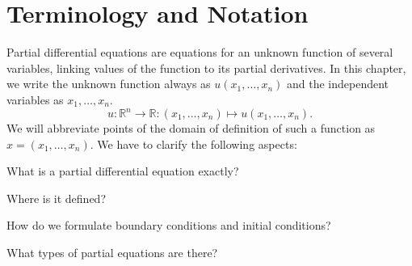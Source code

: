 %
% 
%
\chapter{Terminology and Notation
\label{chapter:terminology-and-notation}}
Partial differential equations are equations for an unknown function of
several variables, linking values of the function to its partial
derivatives.
In this chapter, we write the unknown function always as $u(x_1,\dots,x_n)$
and the independent variables as $x_1,\dots,x_n$.
\[
u\colon \mathbb R^n\to\mathbb R:(x_1,\dots,x_n)\mapsto u(x_1,\dots,x_n).
\]
We will abbreviate points of the domain of definition of such a function
as $x=(x_1,\dots,x_n)$.
We have to clarify the following aspects:
\begin{compactenum}
\item What is a partial differential equation exactly?
\item Where is it defined?
\item How do we formulate boundary conditions and initial conditions?
\item What types of partial equations are there?
\end{compactenum}








